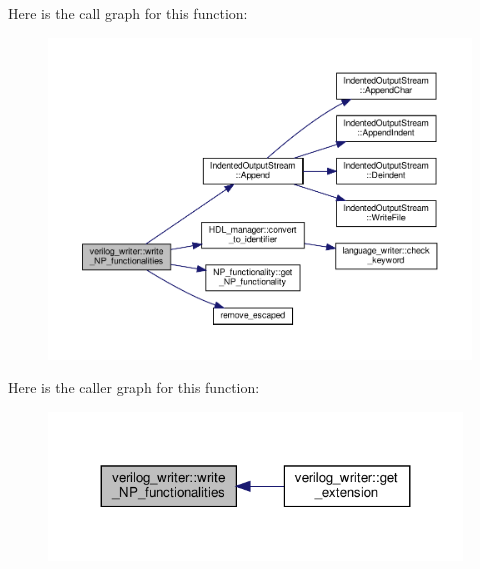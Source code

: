 Here is the call graph for this function\+:
\nopagebreak
\begin{figure}[H]
\begin{center}
\leavevmode
\includegraphics[width=350pt]{d8/dba/classverilog__writer_ab4539a1601893c0c86f57bb66da56e45_cgraph}
\end{center}
\end{figure}
Here is the caller graph for this function\+:
\nopagebreak
\begin{figure}[H]
\begin{center}
\leavevmode
\includegraphics[width=311pt]{d8/dba/classverilog__writer_ab4539a1601893c0c86f57bb66da56e45_icgraph}
\end{center}
\end{figure}
\mbox{\label{classverilog__writer_a6c09eb18456ab75a1086e45ec464cae8}} 
